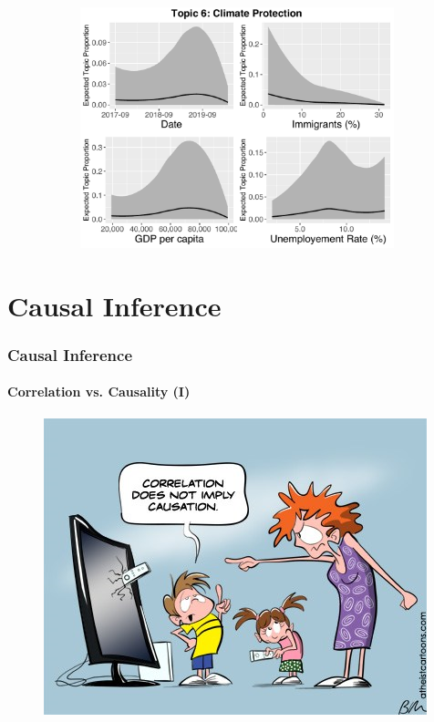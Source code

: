 \documentclass[xcolor=dvipsnames]{beamer}
\begin{document}
\begin{frame}
\begin{figure}[h!]
\begin{subfigure}[b]{0.4\linewidth}
    \includegraphics[width=\linewidth]{../plots/presentation/direct_t6_with_credible.pdf}
  \end{subfigure}
\end{figure}
\end{frame}

\section{Causal Inference}
\begin{frame}
\frametitle{Causal Inference}
\framesubtitle{Correlation vs. Causality (I)}
	\begin{figure}[h!]
  	\centering
  	\includegraphics[scale = 0.60]{../plots/presentation/correlation_causality.png}
	\end{figure}
\end{frame}
\end{document}
